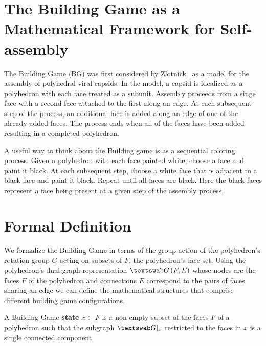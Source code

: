 
\section{The Building Game as a Mathematical Framework for Self-assembly}

The Building Game (BG) was first considered by Zlotnick~\cite{Zlotnick1994} as a model for the assembly of polyhedral viral capsids. In the model, a capsid is idealized as a polyhedron with each face treated as a subunit. Assembly proceeds from a singe face with a second face attached to the first along an edge. At each subsequent step of the process, an additional face is added along an edge of one of the already added faces. The process ends when all of the faces have been added resulting in a completed polyhedron.

A useful way to think about the Building game is as a sequential coloring process. Given a polyhedron with each face painted white, choose a face and paint it black. At each subsequent step, choose a white face that is adjacent to a black face and paint it black. Repeat until all faces are black. Here the black faces represent a face being present at a given step of the assembly process.



\section{Formal Definition}
We formalize the Building Game in terms of the group action of the polyhedron's rotation group $G$ acting on subsets of $F$, the polyhedron's face set. Using the polyhedron's dual graph representation $\PolyGraph\left(F, E\right)$ whose nodes are the faces $F$ of the polyhedron and connections $E$ correspond to the pairs of faces sharing an edge we can define the mathematical structures that comprise different building game configurations.



\begin{mydef}
  A Building Game \textbf{state} $x \subset F$ is a non-empty subset of the faces $F$ of a polyhedron such that the subgraph $\PolyGraph|_x$ restricted to the faces in $x$ is a single connected component. 
\end{mydef} 

